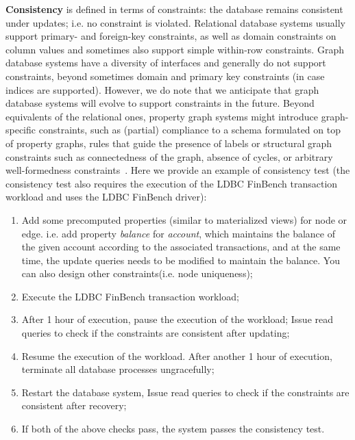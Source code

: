{\bf Consistency} is defined in terms of constraints: the database remains 
consistent under updates; i.e. no constraint is violated. Relational database 
systems usually support primary- and foreign-key constraints, as well as domain 
constraints on column values and sometimes also support simple within-row 
constraints. Graph database systems have a diversity of interfaces and generally
do not support constraints, beyond sometimes domain and primary key constraints 
(in case indices are supported). However, we do note that we anticipate that 
graph database systems will evolve to support constraints in the future. Beyond 
equivalents of the relational ones, property graph systems might introduce 
graph-specific constraints, such as (partial) compliance to a schema formulated 
on top of property graphs, rules that guide the presence of labels or structural
graph constraints such as connectedness of the graph, absence of cycles, or 
arbitrary well-formedness constraints~\cite{DBLP:journals/sosym/SemerathBHSV17}.
Here we provide an example of consistency test (the consistency test also 
requires the execution of the LDBC FinBench transaction workload and uses the 
LDBC FinBench driver):

\begin{enumerate}[label={(\roman*)}]
  \item Add some precomputed properties (similar to materialized views) for node
        or edge. i.e. add property \emph{balance} for \emph{account}, which 
        maintains the balance of the given account according to the associated 
        transactions, and at the same time, the update queries needs to be modified
        to maintain the balance. You can also design other constraints(i.e. node 
        uniqueness);
  \item Execute the LDBC FinBench transaction workload;
  \item After 1 hour of execution, pause the execution of the workload;
        Issue read queries to check if the constraints are consistent after 
        updating;
  \item Resume the execution of the workload. After another 1 hour of execution,
        terminate all database processes ungracefully;
  \item Restart the database system, Issue read queries to check if the 
        constraints are consistent after recovery;
  \item If both of the above checks pass, the system passes the 
        consistency test.
\end{enumerate}
